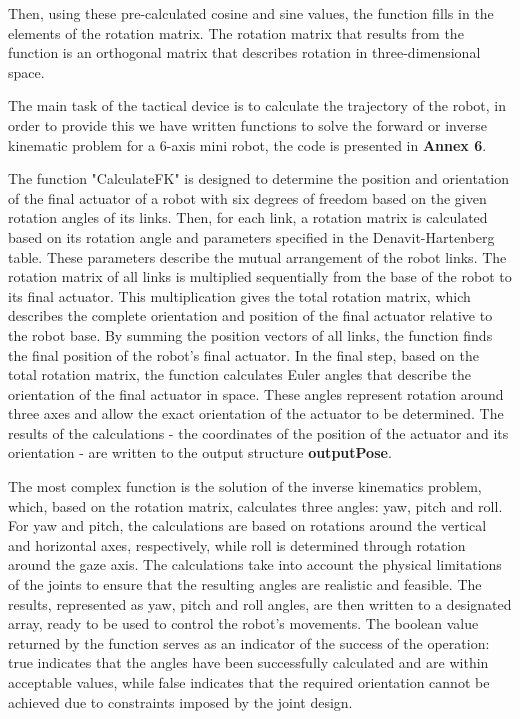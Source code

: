 Then, using these pre-calculated cosine and sine values, the function fills in the elements of the rotation matrix. The rotation matrix that results from the function is an orthogonal matrix that describes rotation in three-dimensional space. 

The main task of the tactical device is to calculate the trajectory of the robot, in order to provide this we have written functions to solve the forward or inverse kinematic problem for a 6-axis mini robot, the code is presented in \textbf{Annex 6}. 

The function "CalculateFK" is designed to determine the position and orientation of the final actuator of a robot with six degrees of freedom based on the given rotation angles of its links. Then, for each link, a rotation matrix is calculated based on its rotation angle and parameters specified in the Denavit-Hartenberg table. These parameters describe the mutual arrangement of the robot links. The rotation matrix of all links is multiplied sequentially from the base of the robot to its final actuator. This multiplication gives the total rotation matrix, which describes the complete orientation and position of the final actuator relative to the robot base.
By summing the position vectors of all links, the function finds the final position of the robot's final actuator.
In the final step, based on the total rotation matrix, the function calculates Euler angles that describe the orientation of the final actuator in space. These angles represent rotation around three axes and allow the exact orientation of the actuator to be determined. The results of the calculations - the coordinates of the position of the actuator and its orientation - are written to the output structure \textbf{outputPose}.

The most complex function is the solution of the inverse kinematics problem, which, based on the rotation matrix, calculates three angles: yaw, pitch and roll. For yaw and pitch, the calculations are based on rotations around the vertical and horizontal axes, respectively, while roll is determined through rotation around the gaze axis. The calculations take into account the physical limitations of the joints to ensure that the resulting angles are realistic and feasible. The results, represented as yaw, pitch and roll angles, are then written to a designated array, ready to be used to control the robot's movements. The boolean value returned by the function serves as an indicator of the success of the operation: true indicates that the angles have been successfully calculated and are within acceptable values, while false indicates that the required orientation cannot be achieved due to constraints imposed by the joint design.